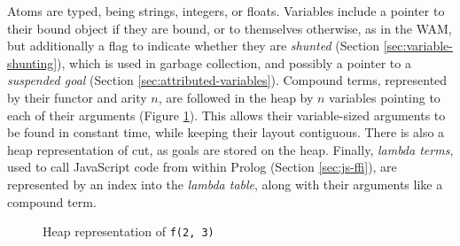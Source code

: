 Atoms are typed, being strings, integers, or floats. Variables include a pointer to their bound object if they are bound, or to themselves otherwise, as in the WAM, but additionally a flag to indicate whether they are \emph{shunted} (Section \ref{sec:variable-shunting}), which is used in garbage collection, and possibly a pointer to a \emph{suspended goal} (Section \ref{sec:attributed-variables}). Compound terms, represented by their functor and arity $n$, are followed in the heap by $n$ variables pointing to each of their arguments (Figure \ref{fig:compound}). This allows their variable-sized arguments to be found in constant time, while keeping their layout contiguous. There is also a heap representation of cut, as goals are stored on the heap. Finally, \emph{lambda terms}, used to call JavaScript code from within Prolog (Section \ref{sec:js-ffi}), are represented by an index into the \emph{lambda table}, along with their arguments like a compound term.

\begin{figure}[H]
\centering
{}
\caption{Heap representation of \texttt{f(2, 3)}}
\label{fig:compound}
\end{figure}

\vspace*{-1.5em}

